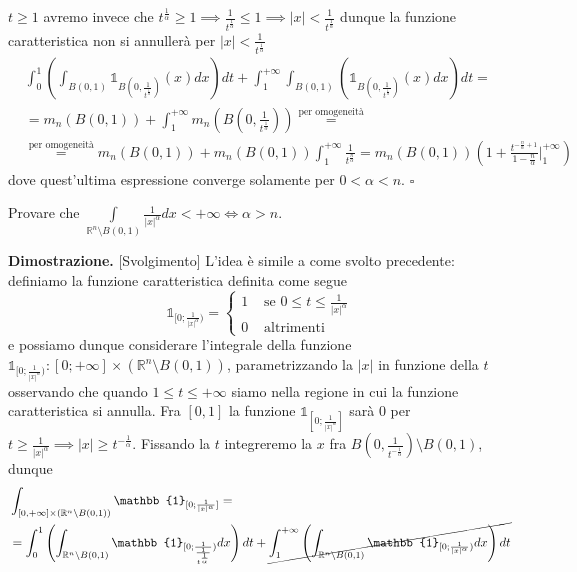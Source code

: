 	$t \geq 1$ avremo invece che $t^{\frac{1}{\alpha}} \geq 1 \implies \frac{1}{t^{\frac{1}{\alpha}}} \leq 1 \implies |x| < \frac{1}{t^{\frac{1}{\alpha}}}$ dunque la funzione caratteristica non si annullerà per $|x| < \frac{1}{t^{\frac{1}{\alpha}}}$
	\begin{align*}
	&\int_0^1 \left( \int_{B(0,1)} \mathbb{1}_{B \left(0, \frac{1}{t^{\frac{1}{\alpha}}} \right)}(x)dx \right)dt + \int_1^{+\infty} \int_{B(0,1)} \left( \mathbb{1}_{B \left(0, \frac{1}{t^{\frac{1}{\alpha}}} \right)}(x)dx	\right)dt = \\
	&=m_n(B(0, 1)) + \int_1^{+\infty} m_n \left(B \left(0, \frac{1}{t^{\frac{1}{\alpha}}} \right) \right) \stackrel{\text{per omogeneità}}{=} \\
	&\stackrel{\text{per omogeneità}}{=} m_n(B(0,1)) + m_n(B(0,1)) \int_1^{+\infty} \frac{1}{t^{\frac{n}{\alpha}}} = m_n(B(0,1))(1 + \frac{t^{-\frac{n}{\alpha} + 1}}{1 - \frac{n}{\alpha}}\Bigg|^{+\infty}_{1})
	\end{align*}
	dove quest'ultima espressione converge solamente per $0 < \alpha < n$.
\hfill $\square$
%
\vspace{0.5cm}
\begin{exercise}
Provare che $\int\limits_{\mathbb{R}^n \setminus B(0,1)} \frac{1}{|x|^\alpha}dx < +\infty \iff \alpha > n$.
\end{exercise}
%
\noindent \textbf{Dimostrazione. }[Svolgimento]
	L'idea è simile a come svolto precedente: definiamo la funzione caratteristica definita come segue
	$$
	\mathbb{1}_{[0; \frac{1}{|x|^\alpha})} = \begin{cases} 1 & \text{ se } 0 \leq t \leq \frac{1}{|x|^\alpha} \\
		0 & \text{ altrimenti }
	\end{cases}
	$$
	e possiamo dunque considerare l'integrale della funzione $\mathbb{1}_{[0; \frac{1}{|x|^\alpha})} : [0; +\infty] \times (\mathbb{R}^n \setminus B(0,1))$, parametrizzando la $|x|$ in funzione della $t$ osservando che quando $1 \leq t \leq +\infty$ siamo nella regione in cui la funzione caratteristica si annulla. Fra $[0, 1]$ la funzione $\mathbb{1}_{[0; \frac{1}{|x|^\alpha}]}$ sarà $0$ per $t \geq \frac{1}{|x|^\alpha} \implies |x| \geq t^{-\frac{1}{\alpha}}$. Fissando la $t$ integreremo la $x$ fra $B(0, \frac{1}{t^{-\frac{1}{\alpha}}}) \setminus B(0,1)$, dunque
	\[\begin{aligned}
	&\int_{[0, +\infty] \times (\mathbb{R}^n \setminus B(0,1))} \mathbb{1}_{[0; \frac{1}{|x|^\alpha}]} = \\
	&=\int_0^{1} \left(\int_{\mathbb{R}^n \setminus B(0,1)} \mathbb{1}_{[0; \frac{1}{\frac{1}{t^{\frac{1}{\alpha}}}})} dx \right) dt + \cancel{\int_1^{+\infty} \left( \int_{\mathbb{R}^n \setminus B(0, 1)} \mathbb{1}_{[0; \frac{1}{|x|^\alpha})} dx \right) dt}
	\end{aligned}\]
